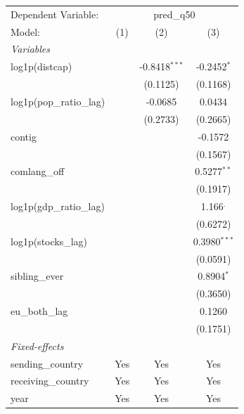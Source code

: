 
\begingroup
\centering
\begin{tabular}{lccc}
   \tabularnewline \midrule \midrule
   Dependent Variable: & \multicolumn{3}{c}{pred\_q50}\\
   Model:                        & (1)     & (2)             & (3)\\  
   \midrule
   \emph{Variables}\\
   log1p(distcap)                &         & -0.8418$^{***}$ & -0.2452$^{*}$\\   
                                 &         & (0.1125)        & (0.1168)\\   
   log1p(pop\_ratio\_lag)        &         & -0.0685         & 0.0434\\   
                                 &         & (0.2733)        & (0.2665)\\   
   contig                        &         &                 & -0.1572\\   
                                 &         &                 & (0.1567)\\   
   comlang\_off                  &         &                 & 0.5277$^{**}$\\   
                                 &         &                 & (0.1917)\\   
   log1p(gdp\_ratio\_lag)        &         &                 & 1.166$^{.}$\\   
                                 &         &                 & (0.6272)\\   
   log1p(stocks\_lag)            &         &                 & 0.3980$^{***}$\\   
                                 &         &                 & (0.0591)\\   
   sibling\_ever                 &         &                 & 0.8904$^{*}$\\   
                                 &         &                 & (0.3650)\\   
   eu\_both\_lag                 &         &                 & 0.1260\\   
                                 &         &                 & (0.1751)\\   
   \midrule
   \emph{Fixed-effects}\\
   sending\_country              & Yes     & Yes             & Yes\\  
   receiving\_country            & Yes     & Yes             & Yes\\  
   year                          & Yes     & Yes             & Yes\\  

\end{tabular}
